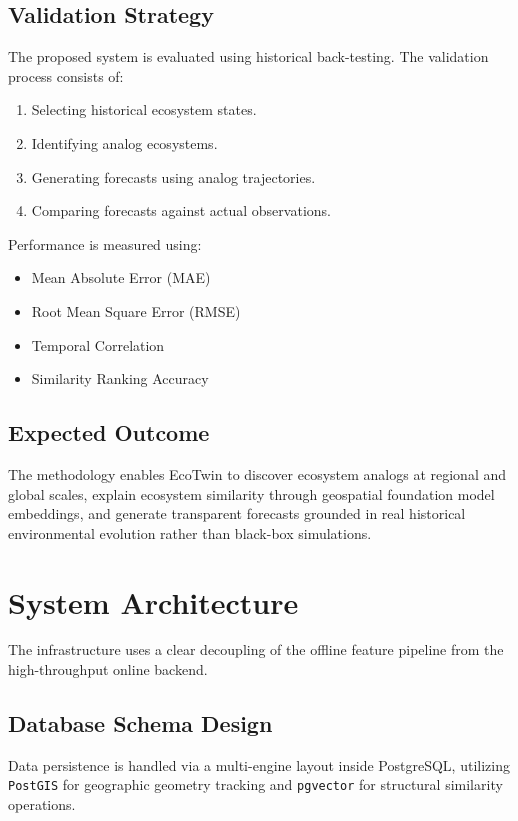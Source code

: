 \documentclass[11pt,a4paper]{article}
\begin{document}
\subsection{Validation Strategy}
The proposed system is evaluated using historical back-testing. The validation process consists of:
\begin{enumerate}
\item Selecting historical ecosystem states.
\item Identifying analog ecosystems.
\item Generating forecasts using analog trajectories.
\item Comparing forecasts against actual observations.
\end{enumerate}
Performance is measured using:
\begin{itemize}
\item Mean Absolute Error (MAE)
\item Root Mean Square Error (RMSE)
\item Temporal Correlation
\item Similarity Ranking Accuracy
\end{itemize}

\subsection{Expected Outcome}
The methodology enables EcoTwin to discover ecosystem analogs at regional and global scales, explain ecosystem similarity through geospatial foundation model embeddings, and generate transparent forecasts grounded in real historical environmental evolution rather than black-box simulations.

\section{System Architecture}
The infrastructure uses a clear decoupling of the offline feature pipeline from the high-throughput online backend.

\subsection{Database Schema Design}
Data persistence is handled via a multi-engine layout inside PostgreSQL, utilizing \texttt{PostGIS} for geographic geometry tracking and \texttt{pgvector} for structural similarity operations.
\end{document}
